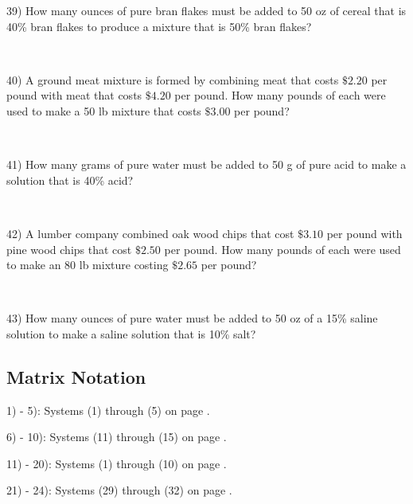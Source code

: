 39) How many ounces of pure bran flakes must be added to 50 oz of cereal that is 40\% bran flakes to produce a mixture that is 50\% bran
flakes?\par
~\par

40) A ground meat mixture is formed by combining meat that costs $\$2.20$ per pound with meat that costs
$\$4.20$ per pound. How many pounds of each were used to make a 50 lb mixture that costs $\$3.00$ per pound?\par
~\par

41) How many grams of pure water must be added to 50 g of pure acid to make a solution that is 40\% acid?\par
~\par

42) A lumber company combined oak wood chips that cost $\$3.10$ per pound with pine wood chips that cost $\$2.50$ per pound.
How many pounds of each were used to make an 80 lb mixture
costing $\$2.65$ per pound?\par
~\par

43) How many ounces of pure water must be added to 50 oz of a 15\% saline solution to make a saline solution that is 10\% salt?

\newpage

\subsection{Matrix Notation}\par

{}\pp

1) - 5): Systems (1) through (5) on page \pageref{matrices1}.\pp

6) - 10): Systems (11) through (15) on page \pageref{matrices1}.\pp

11) - 20): Systems (1) through (10) on page \pageref{matrices2}.\pp

21) - 24): Systems (29) through (32) on page \pageref{matrices3}.%
